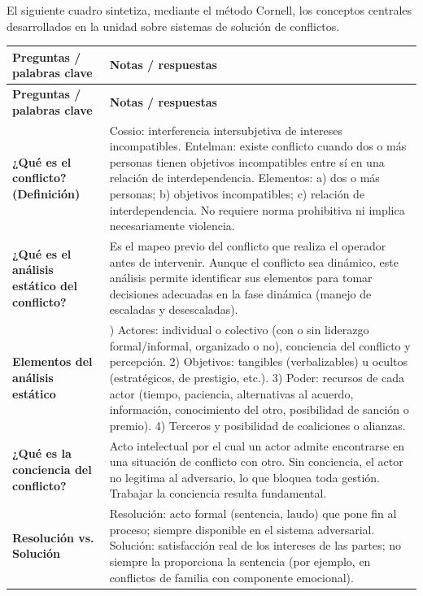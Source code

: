 \documentclass[12pt,oneside]{book}
\begin{document}
El siguiente cuadro sintetiza, mediante el método Cornell, los conceptos centrales desarrollados en la unidad sobre sistemas de solución de conflictos.

\begin{longtable}{@{}>{\raggedright\arraybackslash}p{} >{\raggedright\arraybackslash}X@{}}
\toprule
\textbf{Preguntas / palabras clave} & \textbf{Notas / respuestas} \\
\midrule
\endfirsthead
\toprule
\textbf{Preguntas / palabras clave} & \textbf{Notas / respuestas} \\
\midrule
\endhead

\textbf{¿Qué es el conflicto? (Definición)} &
Cossio: interferencia intersubjetiva de intereses incompatibles. Entelman: existe conflicto cuando dos o más personas tienen objetivos incompatibles entre sí en una relación de interdependencia. Elementos: a) dos o más personas; b) objetivos incompatibles; c) relación de interdependencia. No requiere norma prohibitiva ni implica necesariamente violencia. \\

\textbf{¿Qué es el análisis estático del conflicto?} &
Es el mapeo previo del conflicto que realiza el operador antes de intervenir. Aunque el conflicto sea dinámico, este análisis permite identificar sus elementos para tomar decisiones adecuadas en la fase dinámica (manejo de escaladas y desescaladas). \\

\textbf{Elementos del análisis estático} &
1) Actores: individual o colectivo (con o sin liderazgo formal/informal, organizado o no), conciencia del conflicto y percepción. 2) Objetivos: tangibles (verbalizables) u ocultos (estratégicos, de prestigio, etc.). 3) Poder: recursos de cada actor (tiempo, paciencia, alternativas al acuerdo, información, conocimiento del otro, posibilidad de sanción o premio). 4) Terceros y posibilidad de coaliciones o alianzas. \\

\textbf{¿Qué es la conciencia del conflicto?} &
Acto intelectual por el cual un actor admite encontrarse en una situación de conflicto con otro. Sin conciencia, el actor no legitima al adversario, lo que bloquea toda gestión. Trabajar la conciencia resulta fundamental. \\

\textbf{Resolución vs. Solución} &
Resolución: acto formal (sentencia, laudo) que pone fin al proceso; siempre disponible en el sistema adversarial. Solución: satisfacción real de los intereses de las partes; no siempre la proporciona la sentencia (por ejemplo, en conflictos de familia con componente emocional). \\


\end{longtable}
\end{document}
